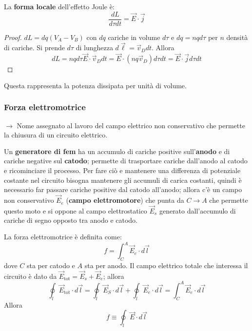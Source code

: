 \documentclass[10pt, a4paper]{scrartcl}
\numberwithin{equation}{subsection}
\theoremstyle{style1}
\newenvironment{boxenv}[1][]{
    \begin{eqbox}[#1]
    }{
   \end{eqbox}
}
\begin{document}
La \textbf{forma locale} dell'effetto Joule \`e:
\begin{equation}
	\frac{dL}{d\tau dt} = \vec{E}\cdot \vec{j}
\end{equation}
\begin{boxenv}[]
\begin{proof}
	$dL = dq (V_A -V_B)$ con $dq$ cariche in volume $d\tau $ e $dq = nq d\tau $ per $n$ densit\`a di cariche. Si prende $d\tau $ di lunghezza $d\vec{\ell }=\vec{v}_D dt$. Allora
	\begin{equation}
		dL = nqd\tau  \vec{E}\cdot \vec{v}_D dt = \vec{E}\cdot (nq\vec{v}_D) d\tau dt = \vec{E}\cdot \vec{j}d\tau dt
	\end{equation}
\end{proof}
\end{boxenv}
\noindent Questa rappresenta la potenza dissipata per unit\`a di volume.
\subsubsection{Forza elettromotrice}

$\to$ Nome assegnato al lavoro del campo elettrico non conservativo che permette la chiusura di un circuito elettrico.

Un \textbf{generatore di fem} ha un accumulo di cariche positive sull'\textbf{anodo} e di cariche negative sul \textbf{catodo}; permette di trasportare cariche dall'anodo al catodo e ricominciare il processo. Per fare ci\`o e mantenere una differenza di potenziale costante nel circuito bisogna mantenere gli accumuli di carica costanti, quindi \`e necessario far passare cariche positive dal catodo all'anodo; allora c'\`e un campo non conservativo $\vec{E}_e$ (\textbf{campo elettromotore}) che punta da $ C\to A$ che permette questo moto e si oppone al campo elettrostatico $\vec{E}_s$ generato dall'accumulo di cariche di segno opposto tra anodo e catodo.

La forza elettromotrice \`e definita come:
\begin{equation}
	f = \int_{C} ^A \vec{E}_e \cdot d\vec{l}
\end{equation}
dove $C$ sta per catodo e $A$ sta per anodo. Il campo elettrico totale che interessa il circuito \`e dato da $\vec{E}_\text{tot} = \vec{E}_s + \vec{E}_e$; allora
\begin{equation}
	\oint_{l} \vec{E}_\text{tot}\cdot d\vec{l} = \oint_{l} \vec{E}_S \cdot d\vec{l} + \oint_{l} \vec{E}_e \cdot d\vec{l} = \int_{C} ^A \vec{E}_e\cdot d\vec{l} 
\end{equation}
Allora
\begin{equation}
	f\equiv\oint_{l} \vec{E}\cdot d\vec{l}
\end{equation}
\end{document}
